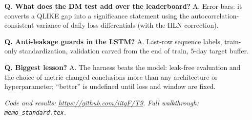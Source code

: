 \documentclass[a4paper,10pt]{article}
\begin{document}
\textbf{Q. What does the DM test add over the leaderboard?} A. Error bars: it converts a QLIKE gap into a significance statement using the autocorrelation-consistent variance of daily loss differentials (with the HLN correction).

\textbf{Q. Anti-leakage guards in the LSTM?} A. Last-row sequence labels, train-only standardization, validation carved from the end of train, 5-day target buffer.

\textbf{Q. Biggest lesson?} A. The harness beats the model: leak-free evaluation and the choice of metric changed conclusions more than any architecture or hyperparameter; ``better'' is undefined until loss and window are fixed.

\vspace{2mm}
\textit{Code and results: \url{https://github.com/iitgF/T9}. Full walkthrough: \texttt{memo\_standard.tex}.}
\end{document}
